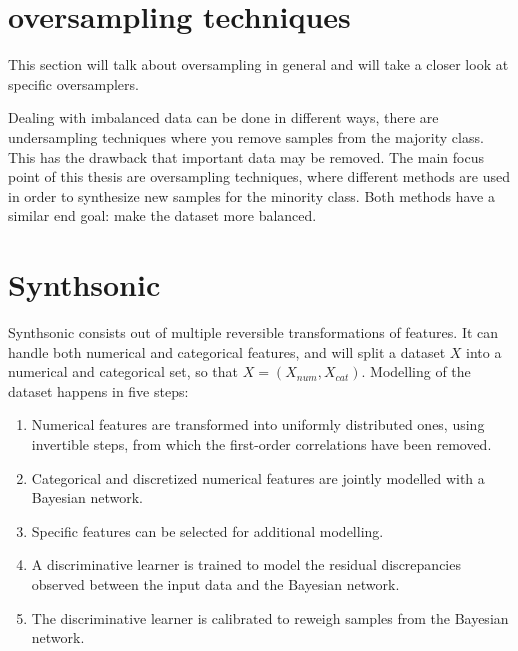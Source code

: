 
\section{oversampling techniques}
This section will talk about oversampling in general and will take a closer look at specific oversamplers.

Dealing with imbalanced data can be done in different ways, there are undersampling techniques where you remove samples from the majority class. This has the drawback that important data may be removed. The main focus point of this thesis are oversampling techniques, where different methods are used in order to synthesize new samples for the minority class. Both methods have a similar end goal: make the dataset more balanced.



\section{Synthsonic}

Synthsonic consists out of multiple reversible transformations of features. It can handle both numerical and categorical features, and will split a dataset $X$ into a numerical and categorical set, so that $X = (X_{num}, X_{cat})$. Modelling of the dataset happens in five steps:

\begin{enumerate}
    \item Numerical features are transformed into uniformly distributed ones, using invertible steps, from which the first-order correlations have been removed.
    \item Categorical and discretized numerical features are jointly modelled with a Bayesian network.
    \item Specific features can be selected for additional modelling.
    \item A discriminative learner is trained to model the residual discrepancies observed between the input data and the Bayesian network.
    \item The discriminative learner is calibrated to reweigh samples from the Bayesian network.
\end{enumerate}

